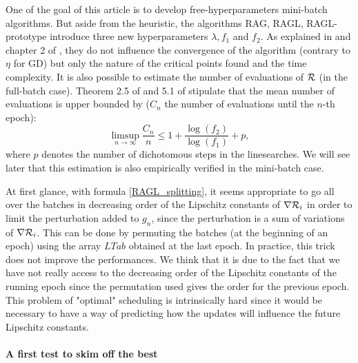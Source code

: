 \begin{remark}
  One of the goal of this article is to develop free-hyperparameters mini-batch algorithms. But aside from the heuristic, the algorithms RAG, RAGL, RAGL-prototype introduce three new hyperparameters $\lambda, f_1$ and $f_2$. As explained in \cite{Lyap_Theory_Bilel,Bilel_ICML} and chapter 2 of \cite{Bilel_thesis}, they do not influence the convergence of the algorithm (contrary to $\eta$ for GD) but only the nature of the critical points found and the time complexity. It is also possible to estimate the number of evaluations of $\mathcal{R}$ (in the full-batch case). Theorem 2.5 of \cite{Bilel_thesis} and 5.1 of \cite{Bilel_ICML} stipulate that the mean number of evaluations is upper bounded by ($C_n$ the number of evaluations until the $n$-th epoch):
\begin{equation}
	\displaystyle{\limsup_{n\to \infty}}\dfrac{C_n}{n} \leq 1+\frac{\log(f_2)}{\log(f_1)}+p,
	\label{complexity_law}
\end{equation}
where $p$ denotes the number of dichotomous steps in the linesearches. 
We will see later that this estimation is also empirically verified in the mini-batch case.
\end{remark}

\begin{remark}
	At first glance, with formula \eqref{RAGL_splitting}, it seems appropriate to go all over the batches in decreasing order of the Lipschitz constants of $\nabla \mathcal{R}_i$ in order to limit the perturbation added to $g_n$, since the perturbation is a sum of variations of $\nabla \mathcal{R}_i$. This can be done by permuting the batches (at the beginning of an epoch) using the array $LTab$ obtained at the last epoch. In practice, this trick does not improve the performances. We think that it is due to the fact that we have not really access to the decreasing order of the Lipschitz constants of the running epoch since the permutation used gives the order for the previous epoch. This problem of "optimal" scheduling is intrinsically hard since it would be necessary to have a way of predicting how the updates will influence the future Lipschitz constants.   
\end{remark}

\paragraph{A first test to skim off the best}
\ \\
\ \\

